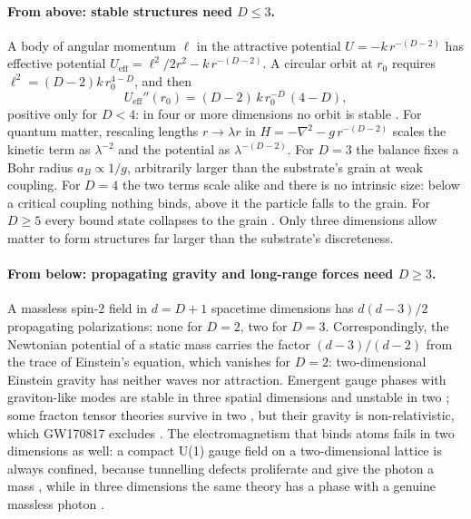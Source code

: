 \documentclass[aps,prd,onecolumn,nofootinbib,superscriptaddress]{revtex4-2}
\begin{document}
\paragraph{From above: stable structures need $D \le 3$.} A body of angular momentum $\ell$ in the attractive potential $U = -k\,r^{-(D-2)}$ has effective potential $U_{\mathrm{eff}} = \ell^2/2r^2 - k\,r^{-(D-2)}$. A circular orbit at $r_0$ requires $\ell^2 = (D-2)k\,r_0^{4-D}$, and then
\begin{equation}
U_{\mathrm{eff}}''(r_0) = (D-2)\,k\,r_0^{-D}\,(4-D),
\end{equation}
positive only for $D<4$: in four or more dimensions no orbit is stable \cite{ehrenfest1917}. For quantum matter, rescaling lengths $r\to\lambda r$ in $H = -\nabla^2 - g\,r^{-(D-2)}$ scales the kinetic term as $\lambda^{-2}$ and the potential as $\lambda^{-(D-2)}$. For $D=3$ the balance fixes a Bohr radius $a_B \propto 1/g$, arbitrarily larger than the substrate's grain at weak coupling. For $D=4$ the two terms scale alike and there is no intrinsic size: below a critical coupling nothing binds, above it the particle falls to the grain. For $D\ge5$ every bound state collapses to the grain \cite{tegmark1997}. Only three dimensions allow matter to form structures far larger than the substrate's discreteness.

\paragraph{From below: propagating gravity and long-range forces need $D \ge 3$.} A massless spin-2 field in $d = D+1$ spacetime dimensions has $d(d-3)/2$ propagating polarizations: none for $D=2$, two for $D=3$. Correspondingly, the Newtonian potential of a static mass carries the factor $(d-3)/(d-2)$ from the trace of Einstein's equation, which vanishes for $D=2$: two-dimensional Einstein gravity has neither waves nor attraction. Emergent gauge phases with graviton-like modes are stable in three spatial dimensions and unstable in two \cite{rasmussen2016}; some fracton tensor theories survive in two \cite{pretko2017}, but their gravity is non-relativistic, which GW170817 excludes \cite{gw170817}. The electromagnetism that binds atoms fails in two dimensions as well: a compact U(1) gauge field on a two-dimensional lattice is always confined, because tunnelling defects proliferate and give the photon a mass \cite{polyakov1977}, while in three dimensions the same theory has a phase with a genuine massless photon \cite{arnold2003}.
\end{document}
